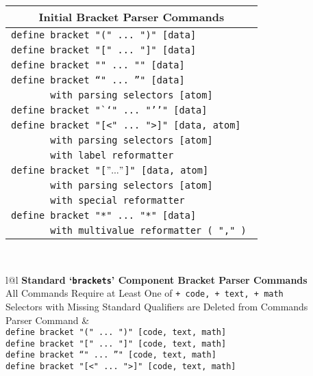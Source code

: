 \documentclass[12pt]{article}
\makeatletter
\newcommand{\TT}[1]{{\tt \bfseries #1}}
\newcommand{\ttkey}[1]{\TT{#1}\index{#1@\TT{#1}}}
\makeatother
\begin{document}
\begin{center}\label{UNTYPED-BRACKET-BUILTINS}
\begin{tabular}{l}
\multicolumn{1}{c}{\bf Initial Bracket Parser Commands}
\\\hline
\tt define bracket "(" ... ")" [data] \\
\tt define bracket "[" ... "]" [data] \\
\tt define bracket "{{" ... "}}" [data] \\
\tt define bracket "`" ... "'" [data] \\
\tt ~~~~~~~with parsing selectors [atom] \\
\tt define bracket "``" ... "''" [data] \\
\tt define bracket "[<" ... ">]" [data, atom] \\
\tt ~~~~~~~with parsing selectors [atom] \\
\tt ~~~~~~~with label reformatter \\
\tt define bracket "[$" ... "$]" [data, atom] \\
\tt ~~~~~~~with parsing selectors [atom] \\
\tt ~~~~~~~with special reformatter \\
\tt define bracket "{*" ... "*}" [data] \\
\tt ~~~~~~~with multivalue reformatter ( "," ) \\
\end{tabular}
\\[2ex]
\begin{tabular}{l@{\hspace*{0.5in}}l}
{\bf Standard `\ttkey{brackets}'\label{STANDARD-BRACKETS-1} Component
     Bracket Parser Commands}
\\[1ex]
{All Commands Require at Least One of {\tt + code, + text, + math}} \\
{Selectors with Missing Standard Qualifiers are Deleted from Commands}
\\[1ex]
Parser Command				& 
\\\hline
\tt define bracket "(" ... ")" [code, text, math] \\
\tt define bracket "[" ... "]" [code, text, math] \\
\tt define bracket "`" ... "'" [code, text, math] \\
\tt define bracket "[<" ... ">]" [code, text, math] \\

\end{tabular}
\end{center}
\end{document}
